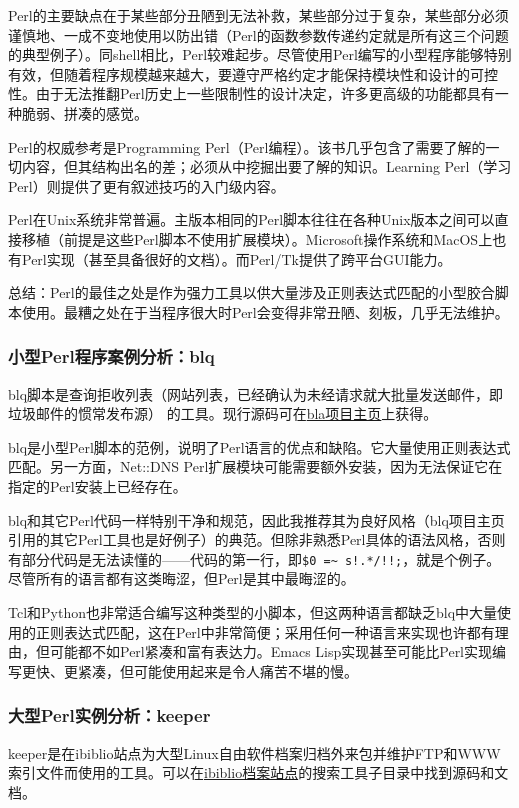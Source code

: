 \documentclass[12pt,oneside]{book}
\begin{document}
Perl的主要缺点在于某些部分丑陋到无法补救，某些部分过于复杂，某些部分必须谨慎地、一成不变地使用以防出错（Perl的函数参数传递约定就是所有这三个问题的典型例子）。同shell相比，Perl较难起步。尽管使用Perl编写的小型程序能够特别有效，但随着程序规模越来越大，要遵守严格约定才能保持模块性和设计的可控性。由于无法推翻Perl历史上一些限制性的设计决定，许多更高级的功能都具有一种脆弱、拼凑的感觉。

Perl的权威参考是Programming Perl（Perl编程）\cite{Wall2000}。该书几乎包含了需要了解的一切内容，但其结构出名的差；必须从中挖掘出要了解的知识。Learning Perl（学习Perl）\cite{Schwartz-Christiansen}则提供了更有叙述技巧的入门级内容。

Perl在Unix系统非常普遍。主版本相同的Perl脚本往往在各种Unix版本之间可以直接移植（前提是这些Perl脚本不使用扩展模块）。Microsoft操作系统和MacOS上也有Perl实现（甚至具备很好的文档）。而Perl/Tk提供了跨平台GUI能力。

总结：Perl的最佳之处是作为强力工具以供大量涉及正则表达式匹配的小型胶合脚本使用。最糟之处在于当程序很大时Perl会变得非常丑陋、刻板，几乎无法维护。

\subsubsection{小型Perl程序案例分析：blq}
blq脚本是查询拒收列表（网站列表，已经确认为未经请求就大批量发送邮件，即垃圾邮件的惯常发布源）  的工具。现行源码可在\href{http://www.unicom.com/sw/blq/}{bla项目主页}上获得。

blq是小型Perl脚本的范例，说明了Perl语言的优点和缺陷。它大量使用正则表达式匹配。另一方面，Net::DNS Perl扩展模块可能需要额外安装，因为无法保证它在指定的Perl安装上已经存在。

blq和其它Perl代码一样特别干净和规范，因此我推荐其为良好风格（blq项目主页引用的其它Perl工具也是好例子）的典范。但除非熟悉Perl具体的语法风格，否则有部分代码是无法读懂的——代码的第一行，即\verb+$0 =~ s!.*/!!;+，就是个例子。尽管所有的语言都有这类晦涩，但Perl是其中最晦涩的。

Tcl和Python也非常适合编写这种类型的小脚本，但这两种语言都缺乏blq中大量使用的正则表达式匹配，这在Perl中非常简便；采用任何一种语言来实现也许都有理由，但可能都不如Perl紧凑和富有表达力。Emacs Lisp实现甚至可能比Perl实现编写更快、更紧凑，但可能使用起来是令人痛苦不堪的慢。

\subsubsection{大型Perl实例分析：keeper}
keeper是在ibiblio站点为大型Linux自由软件档案归档外来包并维护FTP和WWW索引文件而使用的工具。可以在\href{http://www.ibiblio.org/}{ibiblio档案站点}的搜索工具子目录中找到源码和文档。
\end{document}
